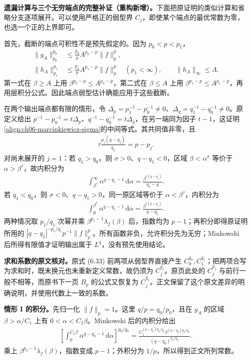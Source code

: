 \documentclass[../../main.tex]{subfiles}
\begin{document}
\begin{remark}
\textbf{遗漏计算与三个无穷端点的完整补证（重构新增）。}下面把原证明的类似计算和省略分支逐项展开。可以使用严格正的弱型界 $C_j$，即使某个端点的最优常数为零，也选一个正的上界即可。

首先，截断的端点可积性不是预先假定的。因为 $p_0<p<p_1$，
\begin{align*}
\|g_A\|_{p_0}^{p_0}&\leqslant\frac{p_0}p A^{p_0-p}\|f\|_p^p,\\
\|h_A\|_{p_1}^{p_1}&\leqslant\frac{p_1}p A^{p_1-p}\|f\|_p^p
\quad(p_1<\infty),\qquad \|h_A\|_\infty\leqslant A.
\end{align*}
第一式在 $\beta\geqslant A$ 上用 $\beta^{p_0-p}\leqslant A^{p_0-p}$，第二式在 $\beta\leqslant A$ 上用 $\beta^{p_1-p}\leqslant A^{p_1-p}$，再用层积分公式。因此端点弱型估计确能应用于这些截断。

在两个输出端点都有限的情形，令 $\Delta_p=p_1^{-1}-p_0^{-1}\ne0$、$\Delta_q=q_1^{-1}-q_0^{-1}\ne0$。原定义给出 $p^{-1}-p_0^{-1}=t\Delta_p$、$q^{-1}-q_0^{-1}=t\Delta_q$，在另一端同为因子 $t-1$，这证明\cref{align:ch06-marcinkiewicz-sigma}的中间等式。其共同值非零，且
\begin{align*}
\tau\frac{p_j(q-q_j)}{q_j}=p-p_j.
\end{align*}
对尚未展开的 $j=1$：若 $q_1>q_0$，则 $\sigma>0$、$q-q_1<0$，区域 $\beta<\alpha^\sigma$ 等价于 $\alpha>\beta^\tau$，故内积分为
\begin{align*}
\int_{\beta^\tau}^\infty\alpha^{q-q_1-1}\,\mathrm d\alpha
=\frac{\beta^{\tau(q-q_1)}}{q_1-q}.
\end{align*}
若 $q_1<q_0$，则 $\sigma<0$、$q-q_1>0$，同一原区域等价于 $\alpha<\beta^\tau$，内积分为
\begin{align*}
\int_0^{\beta^\tau}\alpha^{q-q_1-1}\,\mathrm d\alpha
=\frac{\beta^{\tau(q-q_1)}}{q-q_1}.
\end{align*}
两种情况取 $p_1/q_1$ 次幂并乘 $\beta^{p_1-1}\lambda_f(\beta)$ 后，指数均为 $p-1$；再积分即得原证明所用的 $|q-q_1|^{-p_1/q_1}p^{-1}\|f\|_p^p$。所有函数非负，允许积分先为无穷；Minkowski 后所得有限值才证明输出属于 $L^q$，没有预先使用结论。

\textbf{求和系数的原文核对。}原式 (6.33) 前两项从弱型界直接产生 $C_0^{q_0},C_1^{q_1}$；把两项合写为求和时，既未换元也未重新定义常数，故仍须为 $C_j^{q_j}$。原页此处的 $C_j^{p_j}$ 与前行一般不相等，而原书下一页 $B_p$ 的公式又恢复为 $C_j^{q_j}$。正文保留了这个原文差异的明确说明，并使用代数上一致的系数。

\textbf{情形 I 的积分。}先归一化 $\|f\|_p=1$。这里 $q/p=q_0/p_0$，且在 $g_A$ 的区域 $\beta>\alpha/C_1$ 上有 $0<\alpha<C_1\beta$。Minkowski 后的内积分给出
\begin{align*}
\left[\int_0^{C_1\beta}\alpha^{q-q_0-1}\,\mathrm d\alpha\right]^{p_0/q_0}
=\frac{C_1^{(q-q_0)p_0/q_0}\beta^{(q-q_0)p_0/q_0}}
{(q-q_0)^{p_0/q_0}}.
\end{align*}
乘上 $\beta^{p_0-1}\lambda_f(\beta)$，指数变成 $p-1$；外积分为 $1/p$，所以得到正文所列常数。


\end{remark}
\end{document}
